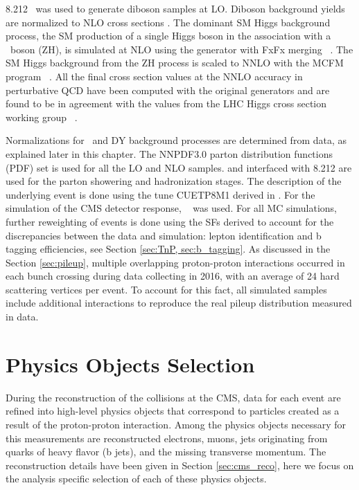 {\PYTHIA} 8.212~\cite{Sjostrand:2007gs,Sjostrand:2014zea} was used to generate diboson samples at LO. Diboson
background yields are normalized to NLO cross sections
\cite{CMS-PAS-SMP-18-002, CMS-PAS-SMP-16-006, Khachatryan:2016txa}. The dominant SM Higgs background process, the SM production of a single Higgs boson in the association with a \PZ ~boson (ZH), is simulated
at NLO using the {\MGMCatNLO} generator with FxFx merging ~\cite{Frederix:2012ps}. 
The SM Higgs background from the ZH process is scaled to NNLO with the
MCFM program ~\cite{Campbell:2010ff}. All the final cross section values at the NNLO accuracy in perturbative QCD have been computed with the original generators and are found to be in agreement with the values from the LHC Higgs cross section working group ~\cite{LHCHXSWG, xsecZH, xsecTT, xsecST, xsecVV}.

Normalizations for \ttbar ~and DY
background processes are determined from data, as explained later in this chapter.
%
%
The NNPDF3.0 \cite{Ball:2014uwa} parton distribution functions
(PDF) set is used for all the LO and NLO samples. {\POWHEG} and {\MGMCatNLO} interfaced with
{\PYTHIA}8.212 are used for the parton
showering and hadronization stages. The description of the underlying event is done using 
the tune CUETP8M1 derived in \cite{Khachatryan:2015pea}. For the simulation of the CMS detector response, \GEANTfour~\cite{GEANT4} was used. 
%
%
For all MC simulations, further reweighting of events is done using the SFs derived to account for 
 the discrepancies between the data and simulation: lepton identification and b tagging efficiencies, see Section \ref{sec:TnP, sec:b_tagging}.
%
%
As discussed in the Section \ref{sec:pileup}, multiple overlapping
proton-proton interactions occurred in each bunch crossing during data collecting in 2016, with
an average of 24 hard scattering vertices per event. To account for this fact, all simulated samples include additional interactions
to reproduce the real pileup distribution measured in data.


\section{Physics Objects Selection}
\label{sec:objects}


During the reconstruction of the collisions at the CMS, data for each event are refined into high-level physics objects that correspond to particles created as a result of the proton-proton interaction. Among the physics objects necessary for this measurements are reconstructed electrons, muons, jets originating from quarks of heavy flavor (b jets), and the missing transverse momentum. The reconstruction details have been given in Section \ref{sec:cms_reco}, here we focus on the analysis specific selection of each of these physics objects.

